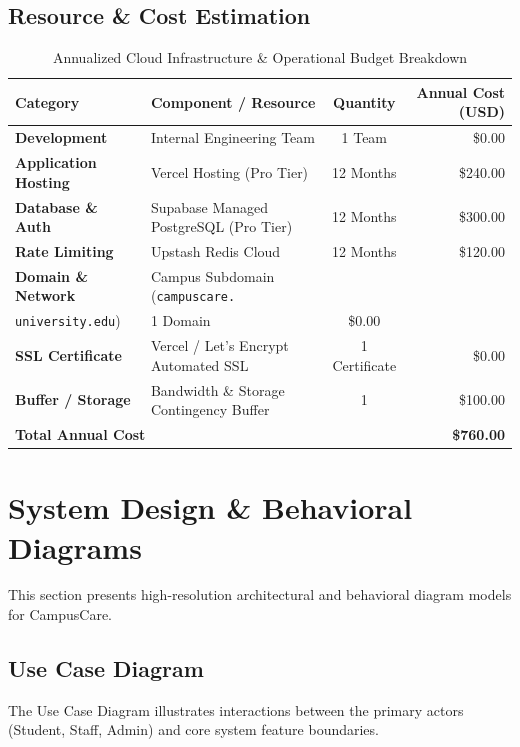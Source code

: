 \documentclass[12pt, a4paper]{article}
\begin{document}
\subsection{Resource \& Cost Estimation}
\begin{table}[H]
    \centering
    \caption{Annualized Cloud Infrastructure \& Operational Budget Breakdown}
    \label{tab:cost_estimation}
    \small
    \begin{tabularx}{\textwidth}{p{} X c r}
        \toprule
        \textbf{Category} & \textbf{Component / Resource} & \textbf{Quantity} & \textbf{Annual Cost (USD)} \\
        \midrule
        \textbf{Development} & Internal Engineering Team & 1 Team & \$0.00 \\
        \textbf{Application Hosting} & Vercel Hosting (Pro Tier) & 12 Months & \$240.00 \\
        \textbf{Database \& Auth} & Supabase Managed PostgreSQL (Pro Tier) & 12 Months & \$300.00 \\
        \textbf{Rate Limiting} & Upstash Redis Cloud & 12 Months & \$120.00 \\
        \textbf{Domain \& Network} & Campus Subdomain (\texttt{campuscare.}\\ \texttt{university.edu}) & 1 Domain & \$0.00 \\
        \textbf{SSL Certificate} & Vercel / Let's Encrypt Automated SSL & 1 Certificate & \$0.00 \\
        \textbf{Buffer / Storage} & Bandwidth \& Storage Contingency Buffer & 1 & \$100.00 \\
        \midrule
        \multicolumn{3}{l}{\textbf{Total Annual Cost}} & \textbf{\$760.00} \\
        \bottomrule
    \end{tabularx}
\end{table}

\section{System Design \& Behavioral Diagrams}

This section presents high-resolution architectural and behavioral diagram models for CampusCare.

\clearpage
\subsection{Use Case Diagram}
\noindent The Use Case Diagram illustrates interactions between the primary actors (Student, Staff, Admin) and core system feature boundaries.
\end{document}
